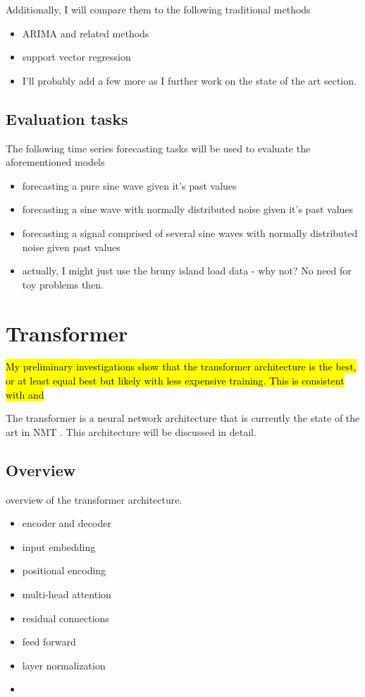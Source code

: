 Additionally, I will compare them to the following traditional methods
\begin{itemize}
	\item ARIMA and related methods
	\item support vector regression
	\item I'll probably add a few more as I further work on the state of the art section.
\end{itemize}

\subsection{Evaluation tasks}
The following time series forecasting tasks will be used to evaluate the aforementioned models
\begin{itemize}
	\item forecasting a pure sine wave given it's past values
	\item forecasting a sine wave with normally distributed noise given it's past values
	\item forecasting a signal comprised of several sine waves with normally distributed noise given past values
	\item actually, I might just use the bruny island load data - why not? No need for toy problems then.
\end{itemize}


\section{Transformer}
\hl{My preliminary investigations show that the transformer architecture is the best, or at least equal best but likely with less expensive training. This is consistent with \protect\cite{Song2017} and \protect\cite{Vaswani2017}}\\
\par
The transformer is a neural network architecture that is currently the state of the art in NMT \citep{Vaswani2017}.
This architecture will be discussed in detail. 

\subsection{Overview}
overview of the transformer architecture.
\begin{itemize}
	\item encoder and decoder
	\item input embedding
	\item positional encoding
	\item multi-head attention
	\item residual connections
	\item feed forward
	\item layer normalization
	\item 
\end{itemize}

